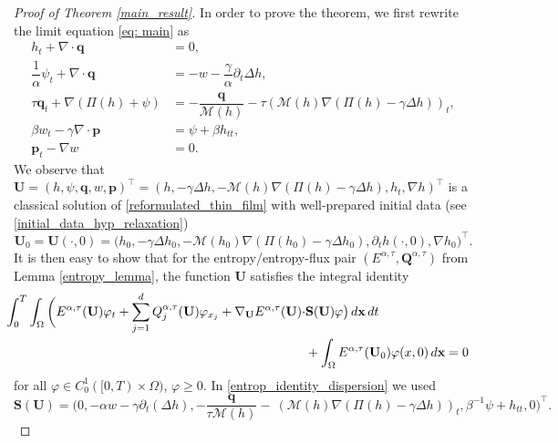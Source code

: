 \documentclass[11pt]{article}
\numberwithin{equation}{section}
\newtheorem{counter example}[theorem]{Counter Example}
\numberwithin{equation}{section}
\numberwithin{equation}{section}
\begin{document}
\begin{proof}[Proof of Theorem \ref{main_result}]
In order to prove the theorem, we first rewrite the limit equation \eqref{eq: main} as 
\begin{equation}\label{reformulated_thin_film}
\begin{aligned}
{h}_t+\nabla\cdot \mathbf{{q}}&=0,\\
    \dfrac{1}{\alpha}{\psi}_t+\nabla\cdot \mathbf{{q}}&=-{w}-\dfrac{\gamma}{\alpha}  \partial_t \Delta{h},\\
    \tau \mathbf{{q}}_t+\nabla(\Pi({h})+{\psi})&=-\dfrac{\mathbf{{q}}}{\mathcal{M}({h})}-\tau \left(\mathcal{M}({h})\nabla(\Pi({h})-\gamma \Delta h)\right)_t,\\
    \beta {w}_t-\gamma\nabla\cdot \mathbf{{p}}&={\psi}+\beta {h}_{tt},\\
    \mathbf{{p}}_t-\nabla{w}&=0.
\end{aligned}
\end{equation}
We observe that $\mathbf{{U}}=({h}, {\psi},{\mathbf{q}}, {w}, {\mathbf{p}})^\top=({h}, -\gamma \Delta{h},-\mathcal{M}({h})\nabla(\Pi({h})-\gamma \Delta{h}), {h}_t, \nabla{h})^\top$ is a classical solution of \eqref{reformulated_thin_film} with well-prepared initial data (see \eqref{initial_data_hyp_relaxation})
\begin{equation}\label{initial_data_hyp}
\mathbf U_0=\mathbf U(\cdot,0)=
\bigl(h_0,-\gamma\Delta h_0,-\mathcal M(h_0)\nabla(\Pi(h_0)-\gamma\Delta h_0),\partial_t h(\cdot,0),\nabla h_0\bigr)^\top.
\end{equation}
It is then easy to show 
that for  
the entropy/entropy-flux  pair $(E^{\alpha, \tau}, \mathbf{Q}^{\alpha, \tau})$
from Lemma \ref{entropy_lemma}, the function ${\mathbf U}$ satisfies  the integral identity 
\begin{equation}
\begin{aligned} \hspace*{-0.3cm}
    \int_{0}^{T}\int_{\Omega} \bigg(E^{\alpha, \tau}(\mathbf{{U}})\varphi_t+\sum_{j=1}^{d}Q^{\alpha, \tau}_j(\mathbf{{U}})\varphi_{x_j}+\nabla_{\mathbf{{U}}}E^{\alpha, \tau}(\mathbf{{U}})\cdot &\mathbf{{S}({U})\varphi}\big) \, d\mathbf{x}\, dt\\
    &+\int_{\Omega} E^{\alpha, \tau}(\mathbf{{U}}_0)\varphi( x,0)\, d\mathbf{x}= 0\label{entrop_identity_dispersion}
\end{aligned}
\end{equation}
 for all $\varphi \in C_{0}^{1}([0,T)\times\Omega)$, $\varphi \ge 0$.
In \eqref{entrop_identity_dispersion} we used  
\[
\mathbf{{S}({{\mathbf {{U}}}})}=\bigg(0, -\alpha{w}- \gamma \partial_t(\Delta{h}),  -\dfrac{\mathbf{q}}{\tau \mathcal{M}({h})}-\ \left(\mathcal{M}({h})\nabla(\Pi({h})-\gamma \Delta h)\right)_t,{\beta}^{-1}{\psi}+{h}_{tt}, 0\bigg)^\top.
\]
\end{proof}
\end{document}
